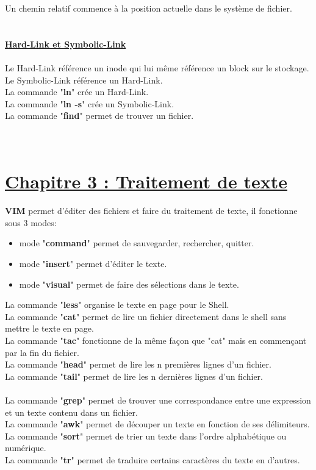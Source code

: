 \documentclass[12pt, a4paper]{article}
\begin{document}
Un chemin relatif commence à la position actuelle dans le système de fichier.\\
\\\\
\underline{\textbf{Hard-Link et Symbolic-Link}}\\
\\
Le Hard-Link référence un inode qui lui même référence un block sur le stockage.\\
Le Symbolic-Link référence un Hard-Link.\\
La commande "\textbf{ln}" crée un Hard-Link.\\
La commande "\textbf{ln -s}" crée un Symbolic-Link.\\
La commande "\textbf{find}" permet de trouver un fichier.\\\\\\
\section*{\underline{Chapitre 3 : Traitement de texte}}
\textbf{VIM} permet d'éditer des fichiers et faire du traitement de texte, il fonctionne sous 3 modes:
\begin{itemize}
\setlength\itemsep{-0.4em}
\item mode "\textbf{command}" permet de sauvegarder, rechercher, quitter.
\item mode "\textbf{insert}" permet d'éditer le texte.
\item mode "\textbf{visual}" permet de faire des sélections dans le texte.\\
\end{itemize}
La commande "\textbf{less}" organise le texte en page pour le Shell.\\
La commande "\textbf{cat}" permet de lire un fichier directement dans le shell sans mettre le texte en page.\\
La commande "\textbf{tac}" fonctionne de la même façon que "cat" mais en commençant par la fin du fichier.\\
La commande "\textbf{head}" permet de lire les n premières lignes d'un fichier.\\
La commande "\textbf{tail}" permet de lire les n dernières lignes d'un fichier.\\
\\
La commande "\textbf{grep}" permet de trouver une correspondance entre une expression et un texte contenu dans un fichier.\\
La commande "\textbf{awk}" permet de découper un texte en fonction de ses délimiteurs.\\
La commande "\textbf{sort}" permet de trier un texte dans l'ordre alphabétique ou numérique.\\
La commande "\textbf{tr}" permet de traduire certains caractères du texte en d'autres.\\
\newpage\vspace*{1cm}
\end{document}
